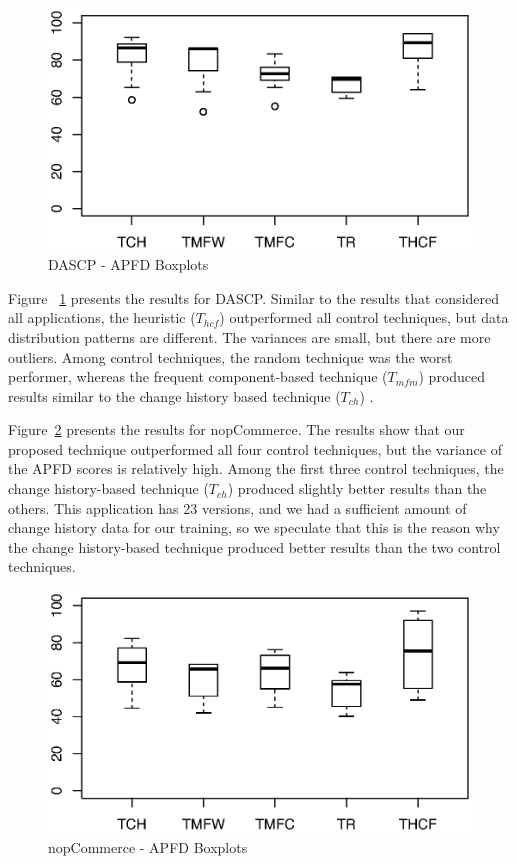 \begin{figure}[!ht]
	\centering
	\includegraphics[width=1.05\linewidth]{./DASCP2_adjusted.eps}
	\vspace*{-10pt}
	\caption{DASCP - APFD Boxplots}
	\label{fig:DASCP}
\end{figure}

Figure ~\ref{fig:DASCP} presents the results for DASCP.
Similar to the results that considered all applications, 
the heuristic ($T_{hcf}$) outperformed all control techniques,
but data distribution patterns are different.  
The variances are small, but there are more outliers.
Among control techniques, the random technique was 
 the worst performer, whereas the frequent component-based technique ($T_{mfm}$)
produced results similar to the change history based technique ($T_{ch}$) .

Figure~\ref{fig:nopCommerce} presents the results for nopCommerce.
The results show that our proposed technique outperformed  
all four control techniques, but the variance of the APFD scores is relatively high. 
Among the first three control techniques, the change history-based 
technique ($T_{ch}$) produced slightly better results than the others.
This application has 23 versions, and we had a sufficient
amount of change history data for our training, so we speculate that
this is the reason why the change history-based technique produced 
better results than the two control techniques. 

\begin{figure}[!ht]
	\centering
	\includegraphics[width=1.05\linewidth]{./nop_adjusted.eps}
	\vspace*{-10pt}
	\caption{nopCommerce - APFD Boxplots}
	\label{fig:nopCommerce}
\end{figure}

